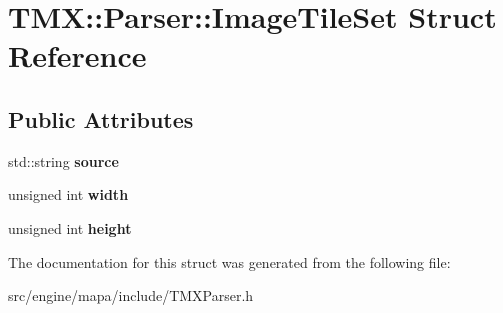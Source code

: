 \hypertarget{struct_t_m_x_1_1_parser_1_1_image_tile_set}{}\section{T\+MX\+:\+:Parser\+:\+:Image\+Tile\+Set Struct Reference}
\label{struct_t_m_x_1_1_parser_1_1_image_tile_set}
\subsection*{Public Attributes}
\begin{DoxyCompactItemize}
\item 
std\+::string {\bfseries source}\hypertarget{struct_t_m_x_1_1_parser_1_1_image_tile_set_ad2c02e60e229cb43a3c1d61779674daf}{}\label{struct_t_m_x_1_1_parser_1_1_image_tile_set_ad2c02e60e229cb43a3c1d61779674daf}

\item 
unsigned int {\bfseries width}\hypertarget{struct_t_m_x_1_1_parser_1_1_image_tile_set_adebd5ef49162a2386b3717bb2be51944}{}\label{struct_t_m_x_1_1_parser_1_1_image_tile_set_adebd5ef49162a2386b3717bb2be51944}

\item 
unsigned int {\bfseries height}\hypertarget{struct_t_m_x_1_1_parser_1_1_image_tile_set_a5d36d0eb96db7a65044f16be084dfedc}{}\label{struct_t_m_x_1_1_parser_1_1_image_tile_set_a5d36d0eb96db7a65044f16be084dfedc}

\end{DoxyCompactItemize}


The documentation for this struct was generated from the following file\+:\begin{DoxyCompactItemize}
\item 
src/engine/mapa/include/T\+M\+X\+Parser.\+h\end{DoxyCompactItemize}
